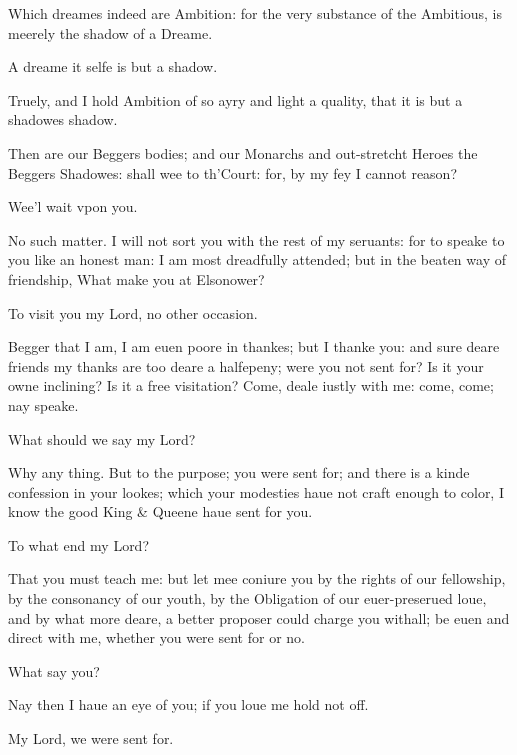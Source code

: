 \documentclass[a5paper,DIV=calc,11pt]{scrbook}
\begin{document}
\begin{drama*}
    \guilspeaks Which dreames indeed are Ambition: for the very substance of the Ambitious, is meerely the shadow of a Dreame.
    
    \hamspeaks A dreame it selfe is but a shadow.
    
    \rosinspeaks Truely, and I hold Ambition of so ayry and light a quality, that it is but a shadowes shadow.
    
    \hamspeaks Then are our Beggers bodies; and our Monarchs and out-stretcht Heroes the Beggers Shadowes: shall wee to th'Court: for, by my fey I cannot reason?
    
     Wee'l wait vpon you.
    
    \hamspeaks No such matter. I will not sort you with the rest of my seruants: for to speake to you like an honest man: I am most dreadfully attended; but in the beaten way of friendship, What make you at Elsonower?
    
    \rosinspeaks To visit you my Lord, no other occasion.
    
    \hamspeaks Begger that I am, I am euen poore in thankes; but I thanke you: and sure deare friends my thanks are too deare a halfepeny; were you not sent for? Is it your owne inclining? Is it a free visitation? Come, deale iustly with me: come, come; nay speake.
    
    \guilspeaks What should we say my Lord?
    
    \hamspeaks Why any thing. But to the purpose; you were sent for; and there is a kinde confession in your lookes; which your modesties haue not craft enough to color, I know the good King \& Queene haue sent for you.
    
    \rosinspeaks To what end my Lord?
    
    \hamspeaks That you must teach me: but let mee coniure you by the rights of our fellowship, by the consonancy of our youth, by the Obligation of our euer-preserued loue, and by what more deare, a better proposer could charge you withall; be euen and direct with me, whether you were sent for or no.
    
    \rosinspeaks What say you?
    
    \hamspeaks Nay then I haue an eye of you; if you loue me hold not off.
    
    \guilspeaks My Lord, we were sent for.
    

\end{drama*}
\end{document}
